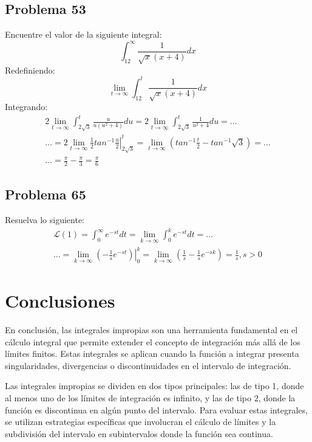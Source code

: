 \documentclass{article}
\begin{document}
\subsection{Problema 53}
Encuentre el valor de la siguiente integral:
\setcounter{equation}{0}
\begin{equation}
    \int_{12}^{\infty}\frac{1}{\sqrt{x}(x+4)}dx
\end{equation}
Redefiniendo:
\begin{equation}
    \lim_{t\to \infty} \int_{12}^{t}\frac{1}{\sqrt{x}(x+4)}dx
\end{equation}
Integrando:
\begin{align}
    2\lim_{t\to \infty} \int_{2\sqrt{3}}^{t} \frac{u}{u(u^2+4)}du = 2\lim_{t\to \infty} \int_{2\sqrt{3}}^{t} \frac{1}{u^2+4}du = \dots \\ \dots = 2\lim_{t\to \infty} \left.\frac{1}{2}tan^{-1}\frac{u}{2}\right|_{2\sqrt{3}}^{t} = \lim_{t\to \infty} \left(tan^{-1}\frac{t}{2}-tan^{-1}\sqrt{3}\right) = \dots \\ \dots =\frac{\pi}{2}-\frac{\pi}{3} = \frac{\pi}{6}
\end{align}

\subsection{Problema 65}
Resuelva lo siguiente:
\setcounter{equation}{0}
\begin{align}
    \mathcal{L} (1) = \int_{0}^{\infty}e^{-st}dt = \lim_{k\to \infty} \int_{0}^{k}e^{-st}dt = \dots \\ \dots = \lim_{k\to \infty} \left.\left(-\frac{1}{s}e^{-st}\right)\right|_0^k = \lim_{k\to \infty} \left(\frac{1}{s}-\frac{1}{s}e^{-sk}\right) = \frac{1}{s},s>0
\end{align}

\section{Conclusiones}
En conclusión, las integrales impropias son una herramienta fundamental en el cálculo integral que permite extender el concepto de integración más allá de los límites finitos. Estas integrales se aplican cuando la función a integrar presenta singularidades, divergencias o discontinuidades en el intervalo de integración.

Las integrales impropias se dividen en dos tipos principales: las de tipo 1, donde al menos uno de los límites de integración es infinito, y las de tipo 2, donde la función es discontinua en algún punto del intervalo. Para evaluar estas integrales, se utilizan estrategias específicas que involucran el cálculo de límites y la subdivisión del intervalo en subintervalos donde la función sea continua.
\end{document}
